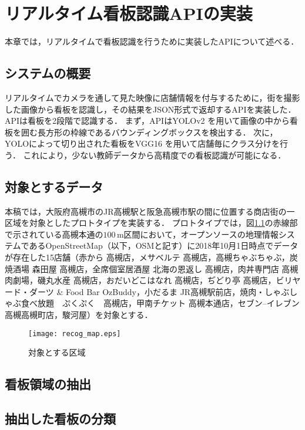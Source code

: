 \chapter{リアルタイム看板認識APIの実装}
\label{chapter:implement_recog}
本章では，リアルタイムで看板認識を行うために実装したAPIについて述べる．

\section{システムの概要}
  リアルタイムでカメラを通して見た映像に店舗情報を付与するために，街を撮影した画像から看板を認識し，その結果をJSON形式で返却するAPIを実装した\cite{Kitamura:2018}．
  APIは看板を2段階で認識する．
  まず，APIはYOLOv2 \cite{Redmon:2017}を用いて画像の中から看板を囲む長方形の枠線であるバウンディングボックスを検出する．
  次に，YOLOによって切り出された看板をVGG16 \cite{Simonyan:2015}を用いて店舗毎にクラス分けを行う．
  これにより，少ない教師データから高精度での看板認識が可能になる．
  
\section{対象とするデータ}
  本稿では，大阪府高槻市のJR高槻駅と阪急高槻市駅の間に位置する商店街の一区域を対象としたプロトタイプを実装する．
  プロトタイプでは，図\ref{figure:recog_map}の赤線部で示されている高槻本通の$100\, \mathrm{m}$区間において，オープンソースの地理情報システムであるOpenStreetMap（以下，OSMと記す）\cite{Haklay:2008}に2018年10月1日時点でデータが存在した15店舗（赤から 高槻店，メサベルテ 高槻店，高槻ちゃぶちゃぶ，炭焼酒場 森田屋 高槻店，全席個室居酒屋 北海の恩返し 高槻店，肉丼専門店 高槻肉劇場，磯丸水産 高槻店，おだいどこはなれ 高槻店，ぢどり亭 高槻店，ビリヤード・ダーツ \& Food Bar OzBuddy，小だるま JR高槻駅前店，焼肉・しゃぶしゃぶ食べ放題　ぷくぷく　高槻店，甲南チケット 高槻本通店，セブン--イレブン 高槻高槻町店，駿河屋）を対象とする．
  \begin{figure}[tb]
    \centerline{\texttt{[image: recog\_map.eps]}}
    \caption{対象とする区域}
    \label{figure:recog_map}
  \end{figure}

\section{看板領域の抽出}

\section{抽出した看板の分類}

